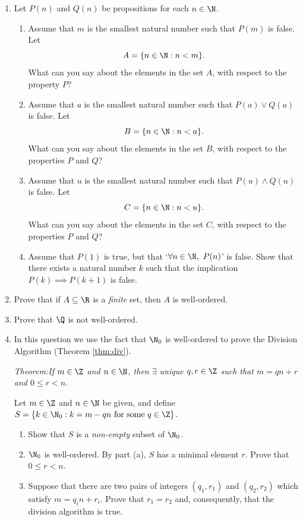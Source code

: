\begin{exercises}{}{}
\begin{enumerate}
	\item Let $P(n)$ and $Q(n)$ be propositions for each $n\in\N$.
	\begin{enumerate}
		\item Assume that $m$ is the smallest natural number such that $P(m)$ is false. Let
		\[A=\{n\in\N:n<m\}.\]
		What can you say about the elements in the set $A$, with respect to the property $P$?
		\item Assume that $a$ is the smallest natural number such that $P(a)\vee Q(a)$ is false. Let
		\[B=\{n\in\N:n<a\}.\]
		What can you say about the elements in the set $B$, with respect to the properties $P$ and $Q$?
		\item Assume that $u$ is the smallest natural number such that $P(u)\wedge Q(u)$ is false. Let
		\[C=\{n\in\N:n<u\}.\]
		What can you say about the elements in the set $C$, with respect to the properties $P$ and $Q$?
		\item Assume that $P(1)$ is true, but that `$\forall n\in\N,\ P(n)$' is false. Show that there exists a natural number $k$ such that the implication $P(k)\implies P(k+1)$ is false.
	\end{enumerate}
	
	\item Prove that if $A\subseteq\R$ is a \emph{finite} set, then $A$ is well-ordered.
	
	\item Prove that $\Q$ is not well-ordered.
  
	\item In this question we use the fact that $\N_0$ is well-ordered to prove the Division Algorithm (Theorem \ref{thm:div}).\par
	\emph{Theorem:\quad If $m\in\Z$ and $n\in\N$, then $\exists$ unique $q,r\in\Z$ such that $m=qn+r$ and $0\le r<n$.}\par
	
	Let $m\in\Z$ and $n\in\N$ be given, and define $S=\{k\in\N_0:k=m-qn\text{ for some }q\in\Z\}$.	
	\begin{enumerate}
		\item Show that $S$ is a \emph{non-empty} subset of $\N_0$.
		\item $\N_0$ is well-ordered. By part (a), $S$ has a minimal element $r$. Prove that $0\le r<n$.
		\item Suppose that there are two pairs of integers $(q_1,r_1)$ and $(q_2,r_2)$ which satisfy $m=q_in+r_i$. Prove that $r_1=r_2$ and, consequently, that the division algorithm is true.
	\end{enumerate}
	

\end{enumerate}
\end{exercises}
